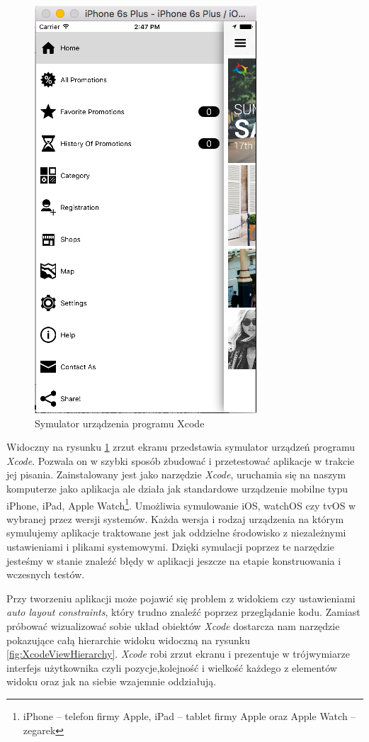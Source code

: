 \documentclass{iiuwb}
\begin{document}
\begin{figure}[!th]
\centering
\includegraphics[scale=.7]{image/XcodeSymulator.png}
\caption{Symulator urządzenia programu Xcode}
\label{fig:XcodeSymulator}
\end{figure}
Widoczny na rysunku \ref{fig:XcodeSymulator} zrzut ekranu przedstawia symulator urządzeń programu \textit{Xcode}. Pozwala on w szybki sposób zbudować i przetestować aplikacje w trakcie jej pisania. Zainstalowany jest jako narzędzie \textit{Xcode}, uruchamia się na naszym komputerze jako aplikacja ale działa jak standardowe urządzenie mobilne typu iPhone, iPad, Apple Watch\footnote{iPhone -- telefon firmy Apple, iPad -- tablet firmy Apple oraz Apple Watch -- zegarek}. Umożliwia symulowanie iOS, watchOS czy tvOS w wybranej przez wersji systemów. Każda wersja i rodzaj urządzenia na którym symulujemy aplikacje traktowane jest jak oddzielne środowisko z niezależnymi ustawieniami i plikami systemowymi. Dzięki symulacji poprzez te narzędzie jesteśmy w stanie znaleźć błędy w aplikacji jeszcze na etapie konstruowania i wczesnych testów.

Przy tworzeniu aplikacji może pojawić się problem z widokiem czy ustawieniami \textit{auto layout constraints}, który trudno znaleźć poprzez przeglądanie kodu. Zamiast próbować wizualizować sobie układ obiektów \textit{Xcode} dostarcza nam narzędzie pokazujące całą hierarchie widoku widoczną na rysunku \ref{fig:XcodeViewHierarchy}. \textit{Xcode} robi zrzut ekranu i prezentuje w trójwymiarze interfejs użytkownika czyli pozycje,kolejność i wielkość każdego z elementów widoku oraz jak na siebie wzajemnie oddziałują.
\end{document}

